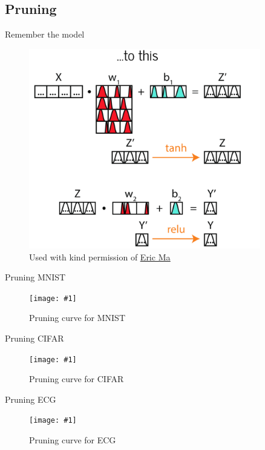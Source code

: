 \documentclass{beamer}
\newcommand{\fitfigure}[1]{\centering\texttt{[image: \#1]}}
\newcommand{\mdlink}[2]{\href{#2}{\underline{#1}}}
\begin{document}
\subsection{Pruning}

\begin{frame}{Remember the model}
	\begin{figure}
		\centering
		\includegraphics[width = 0.9\textwidth]{im/going_bayesian2.png}
		\caption{Used with kind permission of \mdlink{Eric Ma}{https://ericmjl.github.io/}}
	\end{figure}
\end{frame}

\begin{frame}{Pruning MNIST}
	\begin{figure}
		\fitfigure{/home/rob/Dropbox/ml_projects/weight_uncertainty/weight_uncertainty/im/pruning_curves/mnist_pruning_curve.png}
		\caption{Pruning curve for MNIST}
	\end{figure}
\end{frame}

\begin{frame}{Pruning CIFAR}
	\begin{figure}
		\fitfigure{/home/rob/Dropbox/ml_projects/weight_uncertainty/weight_uncertainty/im/pruning_curves/cifar_pruning_curve.png}
		\caption{Pruning curve for CIFAR}
	\end{figure}
\end{frame}

\begin{frame}{Pruning ECG}
	\begin{figure}
		\fitfigure{/home/rob/Dropbox/ml_projects/weight_uncertainty/weight_uncertainty/im/pruning_curves/ucr_pruning_curve.png}
		\caption{Pruning curve for ECG}
	\end{figure}
\end{frame}
\end{document}
